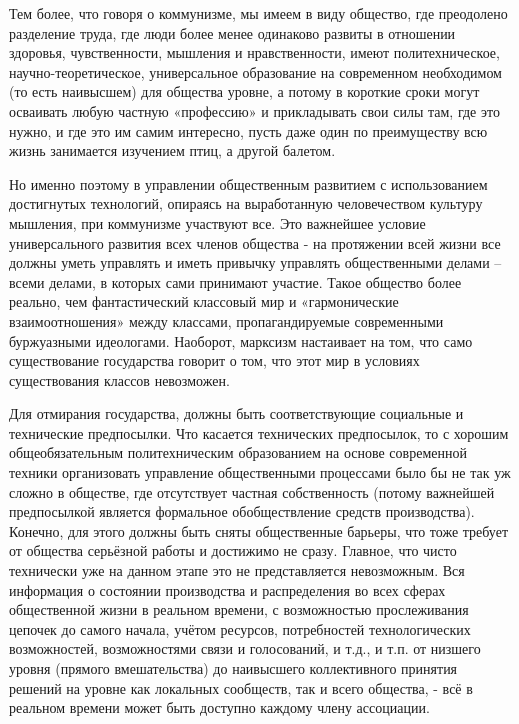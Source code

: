 \documentclass[../main]{subfiles}
\begin{document}
Тем более, что говоря о коммунизме, мы имеем в виду общество, где преодолено разделение труда, где люди более менее одинаково развиты в отношении здоровья, чувственности, мышления и нравственности, имеют политехническое, научно-теоретическое, универсальное образование на современном необходимом (то есть наивысшем) для общества уровне, а потому в короткие сроки могут осваивать любую частную «профессию» и прикладывать свои силы там, где это нужно, и где это им самим интересно, пусть даже один по преимуществу всю жизнь занимается изучением птиц, а другой балетом.

Но именно поэтому в управлении общественным развитием с использованием достигнутых технологий, опираясь на выработанную человечеством культуру мышления, при коммунизме участвуют все. Это важнейшее условие универсального развития всех членов общества - на протяжении всей жизни все должны уметь управлять и иметь привычку управлять общественными делами – всеми делами, в которых сами принимают участие. Такое общество более реально, чем фантастический классовый мир и «гармонические взаимоотношения» между классами, пропагандируемые современными буржуазными идеологами. Наоборот, марксизм настаивает на том, что само существование государства говорит о том, что этот мир в условиях существования классов невозможен.

Для отмирания государства, должны быть соответствующие социальные и технические предпосылки. Что касается технических предпосылок, то с хорошим общеобязательным политехническим образованием на основе современной техники организовать управление общественными процессами было бы не так уж сложно в обществе, где отсутствует частная собственность (потому важнейшей предпосылкой является формальное обобществление средств производства). Конечно, для этого должны быть сняты общественные барьеры, что тоже требует от общества серьёзной работы и достижимо не сразу. Главное, что чисто технически уже на данном этапе это не представляется невозможным. Вся информация о состоянии производства и распределения во всех сферах общественной жизни в реальном времени, с возможностью прослеживания цепочек до самого начала, учётом ресурсов, потребностей технологических возможностей, возможностями связи и голосований, и т.д., и т.п. от низшего уровня (прямого вмешательства) до наивысшего коллективного принятия решений на уровне как локальных сообществ, так и всего общества, - всё в реальном времени может быть доступно каждому члену ассоциации.
\end{document}

